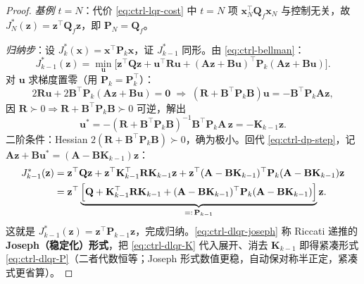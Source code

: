 \begin{proof}
\emph{基例 $t=N$}：代价 \cref{eq:ctrl-lqr-cost} 中 $t=N$ 项 $\mathbf{x}_N^\top\mathbf{Q}_f\mathbf{x}_N$ 与控制无关，故 $J_N^*(\mathbf{z})=\mathbf{z}^\top\mathbf{Q}_f\mathbf{z}$，即 $\mathbf{P}_N=\mathbf{Q}_f$。

\emph{归纳步}：设 $J_{k}^*(\mathbf{x})=\mathbf{x}^\top\mathbf{P}_k\mathbf{x}$，证 $J_{k-1}^*$ 同形。由 \cref{eq:ctrl-bellman}：
\begin{equation}
  J_{k-1}^*(\mathbf{z})=\min_{\mathbf{u}}\Big[\mathbf{z}^\top\mathbf{Q}\mathbf{z}+\mathbf{u}^\top\mathbf{R}\mathbf{u}+(\mathbf{A}\mathbf{z}+\mathbf{B}\mathbf{u})^\top\mathbf{P}_k(\mathbf{A}\mathbf{z}+\mathbf{B}\mathbf{u})\Big].
  \label{eq:ctrl-dp-step}
\end{equation}
对 $\mathbf{u}$ 求梯度置零（用 $\mathbf{P}_k=\mathbf{P}_k^\top$）：
\begin{equation}
  2\mathbf{R}\mathbf{u}+2\mathbf{B}^\top\mathbf{P}_k(\mathbf{A}\mathbf{z}+\mathbf{B}\mathbf{u})=\mathbf{0}\;\Rightarrow\;(\mathbf{R}+\mathbf{B}^\top\mathbf{P}_k\mathbf{B})\mathbf{u}=-\mathbf{B}^\top\mathbf{P}_k\mathbf{A}\mathbf{z},
\end{equation}
因 $\mathbf{R}\succ0\Rightarrow\mathbf{R}+\mathbf{B}^\top\mathbf{P}_k\mathbf{B}\succ0$ 可逆，解出
\begin{equation}
  \mathbf{u}^*=-(\mathbf{R}+\mathbf{B}^\top\mathbf{P}_k\mathbf{B})^{-1}\mathbf{B}^\top\mathbf{P}_k\mathbf{A}\,\mathbf{z}=-\mathbf{K}_{k-1}\mathbf{z}.
\end{equation}
二阶条件：Hessian $2(\mathbf{R}+\mathbf{B}^\top\mathbf{P}_k\mathbf{B})\succ0$，确为极小。回代 \cref{eq:ctrl-dp-step}，记 $\mathbf{A}\mathbf{z}+\mathbf{B}\mathbf{u}^*=(\mathbf{A}-\mathbf{B}\mathbf{K}_{k-1})\mathbf{z}$：
\begin{align}
  J_{k-1}^*(\mathbf{z})
  &=\mathbf{z}^\top\mathbf{Q}\mathbf{z}+\mathbf{z}^\top\mathbf{K}_{k-1}^\top\mathbf{R}\mathbf{K}_{k-1}\mathbf{z}+\mathbf{z}^\top(\mathbf{A}-\mathbf{B}\mathbf{K}_{k-1})^\top\mathbf{P}_k(\mathbf{A}-\mathbf{B}\mathbf{K}_{k-1})\mathbf{z}\notag\\
  &=\mathbf{z}^\top\underbrace{\Big[\mathbf{Q}+\mathbf{K}_{k-1}^\top\mathbf{R}\mathbf{K}_{k-1}+(\mathbf{A}-\mathbf{B}\mathbf{K}_{k-1})^\top\mathbf{P}_k(\mathbf{A}-\mathbf{B}\mathbf{K}_{k-1})\Big]}_{=:\,\mathbf{P}_{k-1}}\mathbf{z}.
  \label{eq:ctrl-dlqr-joseph}
\end{align}
这就是 $J_{k-1}^*(\mathbf{z})=\mathbf{z}^\top\mathbf{P}_{k-1}\mathbf{z}$，完成归纳。\cref{eq:ctrl-dlqr-joseph} 称 Riccati 递推的 \textbf{Joseph（稳定化）形式}，把 \cref{eq:ctrl-dlqr-K} 代入展开、消去 $\mathbf{K}_{k-1}$ 即得紧凑形式 \cref{eq:ctrl-dlqr-P}（二者代数恒等；Joseph 形式数值更稳，自动保对称半正定，紧凑式更省算）。
\end{proof}

